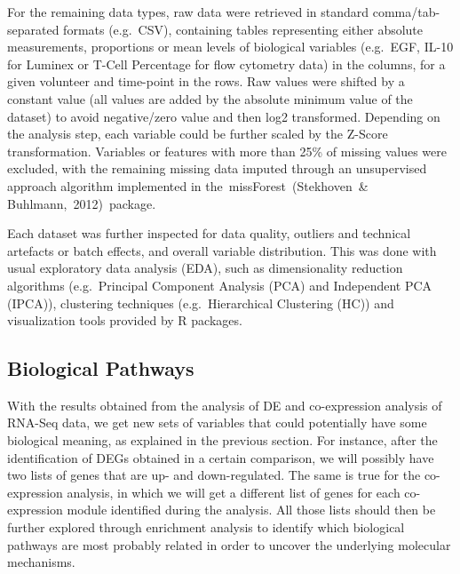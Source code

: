 \documentclass[
]{book}
\begin{document}
For the remaining data types, raw data were retrieved in standard comma/tab-separated formats (e.g.~CSV), containing tables representing either absolute measurements, proportions or mean levels of biological variables (e.g.~EGF, IL-10 for Luminex or T-Cell Percentage for flow cytometry data) in the columns, for a given volunteer and time-point in the rows. Raw values were shifted by a constant value (all values are added by the absolute minimum value of the dataset) to avoid negative/zero value and then log2 transformed. Depending on the analysis step, each variable could be further scaled by the Z-Score transformation. Variables or features with more than 25\% of missing values were excluded, with the remaining missing data imputed through an unsupervised approach algorithm implemented in the~missForest~(Stekhoven~\& Buhlmann,~2012)⁠~package.

Each dataset was further inspected for data quality, outliers and technical artefacts or batch effects, and overall variable distribution. This was done with usual exploratory data analysis (EDA), such as dimensionality reduction algorithms (e.g.~Principal Component Analysis (PCA) and Independent PCA (IPCA)), clustering techniques (e.g.~Hierarchical Clustering (HC)) and visualization tools provided by R packages.

\hypertarget{biological-pathways}{%
\subsection{Biological Pathways}\label{biological-pathways}}

With the results obtained from the analysis of DE and co-expression analysis of RNA-Seq data, we get new sets of variables that could potentially have some biological meaning, as explained in the previous section. For instance, after the identification of DEGs obtained in a certain comparison, we will possibly have two lists of genes that are up- and down-regulated. The same is true for the co-expression analysis, in which we will get a different list of genes for each co-expression module identified during the analysis. All those lists should then be further explored through enrichment analysis to identify which biological pathways are most probably related in order to uncover the underlying molecular mechanisms.
\end{document}
